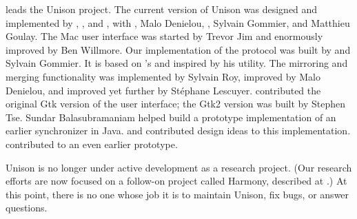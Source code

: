 \documentclass{article}
\begin{document}


 leads the
Unison project.   
%
The current version of Unison was designed and implemented by
    ,
    ,
and
    ,
with
    ,
    {Malo Denielou},
    ,
    Sylvain Gommier, and
    Matthieu Goulay.
%
The Mac user interface was started by Trevor Jim and enormously improved by
Ben Willmore. 
%
Our implementation of the
  protocol was built by
  and Sylvain Gommier.  It is based on
  's
  and inspired by his
  utility.
%
The mirroring and merging functionality was implemented by
  Sylvain Roy, improved by Malo Denielou, and improved yet further by
  St\'ephane Lescuyer.
%
 contributed the original Gtk version of the user
  interface; the Gtk2 version was built by Stephen Tse. 
%
Sundar Balasubramaniam helped build a prototype implementation of
an earlier synchronizer in Java.
and
 contributed design
ideas to this implementation.
contributed to an even earlier prototype.





Unison is no longer under active development as a research
project.  (Our research efforts  are now focused on a follow-on
project called Harmony, described at
.) 
At this point, there is no one whose job it is to maintain Unison,
fix bugs, or answer questions.
\end{document}
